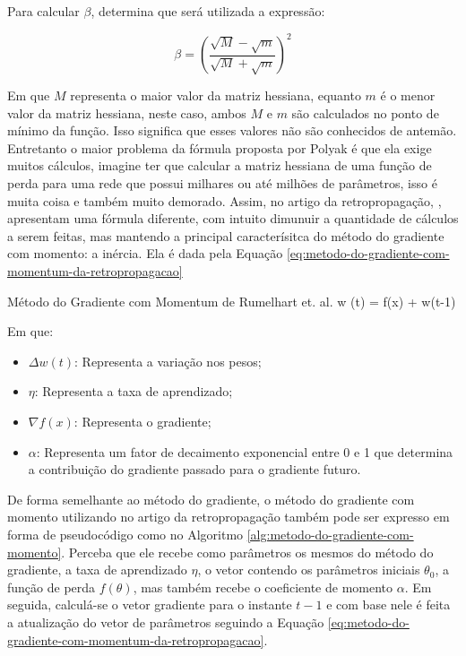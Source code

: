 Para calcular $\beta$, \textcite{polyak1964} determina que será utilizada a expressão:

\[
    \beta = \left( \frac{\sqrt{M} - \sqrt{m}}{\sqrt{M} + \sqrt{m}} \right)^2
\]

Em que $M$ representa o maior valor da matriz hessiana, equanto $m$ é o menor valor da matriz hessiana, neste caso, ambos $M$ e $m$ são calculados no ponto de mínimo da função. Isso significa que esses valores não são conhecidos de antemão. Entretanto o maior problema da fórmula proposta por Polyak é que ela exige muitos cálculos, imagine ter que calcular a matriz hessiana de uma função de perda para uma rede que possui milhares ou até milhões de parâmetros, isso é muita coisa e também muito demorado. Assim, no artigo da retropropagação, \textcite{BackpropagationArticle}, apresentam uma fórmula diferente, com intuito dimunuir a quantidade de cálculos a serem feitas, mas mantendo a principal caracterísitca do método do gradiente com momento: a inércia. Ela é dada pela Equação \ref{eq:metodo-do-gradiente-com-momentum-da-retropropagacao}

\begin{equacaodestaque}{Método do Gradiente com Momentum de Rumelhart et. al.}
        \Delta w (t) = \eta \nabla f(x) + \alpha \Delta w(t-1)
    \label{eq:metodo-do-gradiente-com-momentum-da-retropropagacao}
\end{equacaodestaque}

Em que:

\begin{itemize}
    \item $\Delta w(t)$: Representa a variação nos pesos;
    \item $\eta$: Representa a taxa de aprendizado;
    \item $\nabla f(x)$: Representa o gradiente;
    \item $\alpha$: Representa um fator de decaimento exponencial entre 0 e 1 que determina a contribuição do gradiente passado para o gradiente futuro.
\end{itemize}

De forma semelhante ao método do gradiente, o método do gradiente com momento utilizando no artigo da retropropagação também pode ser expresso em forma de pseudocódigo como no Algoritmo \ref{alg:metodo-do-gradiente-com-momento}. Perceba que ele recebe como parâmetros os mesmos do método do gradiente, a taxa de aprendizado $\eta$, o vetor contendo os parâmetros iniciais $\theta_0$, a função de perda $f(\theta)$, mas também recebe o coeficiente de momento $\alpha$. Em seguida, calculá-se o vetor gradiente para o instante $t-1$ e com base nele é feita a atualização do vetor de parâmetros seguindo a Equação \ref{eq:metodo-do-gradiente-com-momentum-da-retropropagacao}.

